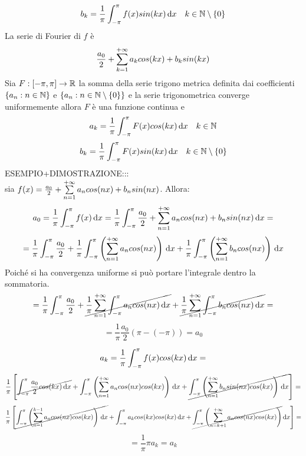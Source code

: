 \[b_k=\frac{1}{\pi}\int_{-\pi}^{\pi}f(x)sin(kx)\,\mathrm{d}{x}\quad k\in\mathbb{N}\setminus{\left\{0\right\}}\]
La serie di Fourier di $f$ è
\[\frac{a_0}{2}+\sum\limits_{k=1}^{+\infty}a_{k}cos(kx)+b_{k}sin(kx)\]
\proposition
Sia $F: \left[-\pi,\pi\right] \to \mathbb{R}$ la somma della serie trigono metrica definita dai coefficienti $\left\{a_n:n\in\mathbb{N}\right\}$ e $\left\{a_n:n\in\mathbb{N}\setminus{\left\{0\right\}}\right\}$ e la serie trigonometrica converge uniformemente allora $F$ è una funzione continua e
\[a_k=\frac{1}{\pi}\int_{-\pi}^{\pi}F(x)cos(kx)\,\mathrm{d}{x}\quad k\in\mathbb{N}\]
\[b_k=\frac{1}{\pi}\int_{-\pi}^{\pi}F(x)sin(kx)\,\mathrm{d}{x}\quad k\in\mathbb{N}\setminus{\left\{0\right\}}\]
ESEMPIO+DIMOSTRAZIONE:::\\
sia $f(x)=\frac{a_0}{2}+\sum\limits_{n=1}^{+\infty}a_{n}cos(nx)+b_{n}sin(nx)$. Allora:\\
\[a_0=\frac{1}{\pi}\int_{-\pi}^{\pi}f(x)\,\mathrm{d}{x}=\frac{1}{\pi}\int_{-\pi}^{\pi}\frac{a_0}{2}+\sum\limits_{n=1}^{+\infty}a_{n}cos(nx)+b_{n}sin(nx)\,\mathrm{d}{x}=\]
\[
= \frac{1}{\pi}\int_{-\pi}^{\pi}\frac{a_0}{2} +
\frac{1}{\pi}\int_{-\pi}^{\pi}\left(\sum\limits_{n=1}^{+\infty} a_ncos(nx)\right)\,\mathrm{d}{x} +
\frac{1}{\pi}\int_{-\pi}^{\pi}\left(\sum\limits_{n=1}^{+\infty} b_ncos(nx)\right)\,\mathrm{d}{x}
\]
Poiché si ha convergenza uniforme si può portare l'integrale dentro la sommatoria.
\[
= \frac{1}{\pi}\int_{-\pi}^{\pi}\frac{a_0}{2} +
\cancel{\frac{1}{\pi}\sum\limits_{n=1}^{+\infty}\int_{-\pi}^{\pi} a_ncos(nx)\,\mathrm{d}{x}} +
\cancel{\frac{1}{\pi}\sum\limits_{n=1}^{+\infty}\int_{-\pi}^{\pi} b_ncos(nx)\,\mathrm{d}{x}}=
\]
\[=\frac{1}{\pi}\frac{a_0}{2}\left(\pi-(-\pi)\right)=a_0\]


\[a_k=\frac{1}{\pi}\int_{-\pi}^{\pi}f(x)cos(kx)\,\mathrm{d}{x}=\]
\[\frac{1}{\pi}\left[
\cancel{\int_{-\pi}^{\pi}\frac{a_0}{2}cos(kx)\,\mathrm{d}{x}}+
\int_{-\pi}^{\pi}\left(\sum\limits_{n=1}^{+\infty}a_ncos(nx)cos(kx)\right)\,\mathrm{d}{x}+
\cancel{\int_{-\pi}^{\pi}\left(\sum\limits_{n=1}^{+\infty}b_nsin(nx)cos(kx)\right)\,\mathrm{d}{x}}
\right]=\]
\[\frac{1}{\pi}\left[
\cancel{\int_{-\pi}^{\pi}\left(\sum\limits_{n=1}^{k-1} a_ncos(nx)cos(kx)\right)\,\mathrm{d}{x}}+
\int_{-\pi}^{\pi}a_kcos(kx)cos(kx)\,\mathrm{d}{x}+
\cancel{\int_{-\pi}^{\pi}\left(\sum\limits_{n=k+1}^{+\infty}a_ncos(nx)cos(kx)\right)}\,\mathrm{d}{x}
\right]=\]
\[=\frac{1}{\pi}\pi a_k=a_k\]

